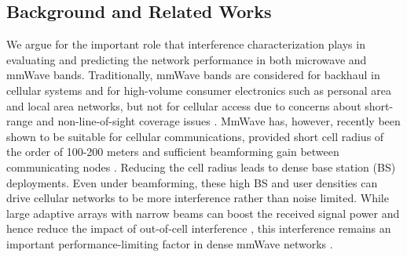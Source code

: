 \documentclass[12pt, draftclsnofoot, onecolumn]{IEEEtran}
\theoremstyle{plain}
\begin{document}
\subsection{Background and Related Works}\vspace{-.1in}
We argue for the important role that interference characterization plays in evaluating and predicting the network performance in  both microwave and mmWave bands. %
Traditionally, mmWave bands are considered for backhaul in cellular systems and for high-volume
consumer electronics such as personal area and local
area networks, but not for cellular access due to concerns about short-range
and non-line-of-sight coverage issues \cite{Baimm14,mmWaveEnable}. MmWave has, however, recently been shown {to be} suitable for
cellular communications, provided short cell radius of the order of 100-200 meters and sufficient beamforming gain between communicating nodes \cite{mmWaveEnable}. Reducing the cell radius leads to dense base station {(BS)} deployments. Even under beamforming, these high BS and user densities can drive cellular networks to be more interference rather than noise limited.  
While large adaptive arrays with narrow beams can boost the received signal power and hence reduce the impact of out-of-cell interference \cite{6894455,ref_2e}, this interference remains an important performance-limiting factor in dense mmWave networks \cite{Int_Regime_7499308}.  
 
\end{document}
